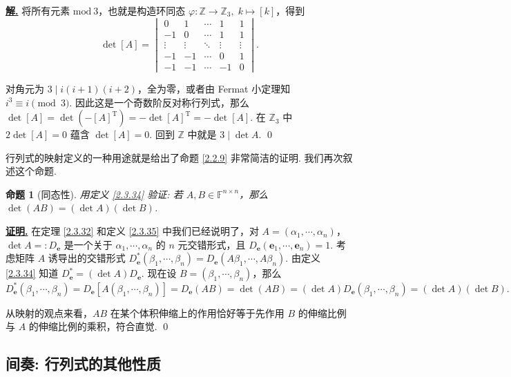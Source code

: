 \documentclass[10pt,openany]{article}
\theoremstyle{thmstyle} %
\theoremstyle{defstyle} %
\theoremstyle{prostyle} %
\newtheorem{proposition}[theorem]{命题}
\theoremstyle{exastyle}
\theoremstyle{remstyle}
\renewenvironment{proof}[1][证明]{\par\underline{\textbf{#1.}} \;\fangsong}{\qed\par}
\newenvironment{solution}{\par\underline{\textbf{解.}} \;\fangsong}{\qed\par}
\newcommand{\T}{^{\text{T}}}
\newcommand{\F}{\mathbb{F}}
\newcommand{\n}{^{n \times n}}
\begin{document}
\begin{solution}
	将所有元素 \( \text{mod} \ 3 \)，也就是构造环同态 \( \varphi: \mathbb{Z} \to \mathbb{Z}_3, \; k \mapsto [k] \)，得到
	\[ \det [A]=\begin{vmatrix}
		0 & 1 & \cdots & 1 & 1 \\
		-1 & 0 & \cdots & 1 & 1 \\
		\vdots & \vdots & \ddots & \vdots & \vdots \\
		-1 & -1 & \cdots & 0 & 1 \\
		-1 & -1 & \cdots & -1 & 0
	\end{vmatrix}.  \]
	
	对角元为 \( 3 \mid  i(i+1)(i+2) \)，全为零，或者由 Fermat 小定理知 \( i^3 \equiv i \pmod 3 \). 因此这是一个奇数阶反对称行列式，那么 \( \det [A]=\det (-[A]\T)= -\det [A]\T= -\det [A] \). 在 \( \mathbb{Z}_3 \) 中 \( 2\det [A]=0 \) 蕴含 \( \det [A]=0 \). 回到 \( \mathbb{Z} \) 中就是 \( 3 \mid \det A \).
\end{solution}

行列式的映射定义的一种用途就是给出了命题 \ref{2.2.9} 非常简洁的证明. 我们再次叙述这个命题.

\begin{proposition}[同态性]
	用定义 \ref{2.3.34} 验证: 若 \( A,B \in \F\n \)，那么 \( \det(AB)=(\det A)(\det B) \).
\end{proposition}

\begin{proof}
	在定理 \ref{2.3.32} 和定义 \ref{2.3.35} 中我们已经说明了，对 \( A=(\alpha_1,\cdots,\alpha_n) \)，\( \det A=:D_{\bm{e}} \) 是一个关于 \( \alpha_1,\cdots,\alpha_n \) 的 \( n \) 元交错形式，且 \( D_{\bm{e}}(\bm{e}_1,\cdots,\bm{e}_n)=1 \). 考虑矩阵 \( A \) 诱导出的交错形式 \( D_{\bm{e}}^*(\beta_1,\cdots,\beta_n)=D_{\bm{e}}(A\beta_1,\cdots,A\beta_n) \). 由定义 \ref{2.3.34} 知道 \( D_{\bm{e}}^*=(\det A)D_{\bm{e}} \). 现在设 \( B=(\beta_1,\cdots,\beta_n) \)，那么
	\[ D_{\bm{e}}^*(\beta_1,\cdots,\beta_n)=D_{\bm{e}}[A(\beta_1,\cdots,\beta_n)]=D_{\bm{e}}(AB)=\det(AB)= (\det A)D_{\bm{e}}(\beta_1,\cdots,\beta_n)=(\det A)(\det B). \]
	
	从映射的观点来看，\( AB \) 在某个体积伸缩上的作用恰好等于先作用 \( B \) 的伸缩比例与 \( A \) 的伸缩比例的乘积，符合直觉.
\end{proof}

\subsection{间奏: 行列式的其他性质}
\end{document}
